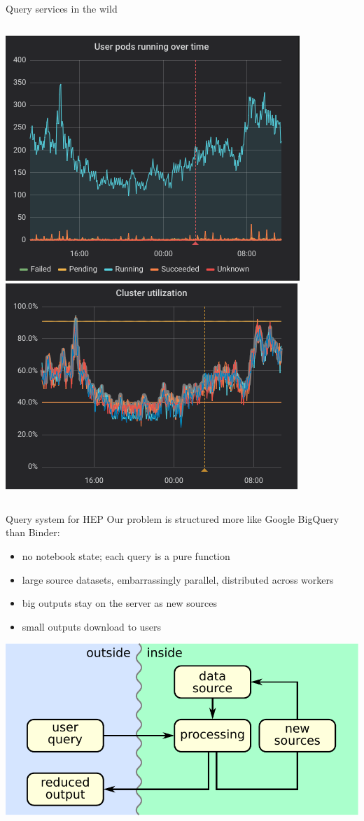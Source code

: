 \documentclass[aspectratio=169]{beamer}
\begin{document}
\begin{frame}{Query services in the wild}
\begin{uncoverenv}
\begin{columns}
\includegraphics[height=3 cm]{binder-notebooks-running.png}\mbox{ }\includegraphics[height=3 cm]{binder-utilization.png}
\end{columns}
\end{uncoverenv}
\end{frame}

\begin{frame}{Query system for HEP}
\vspace{0.35 cm}
Our problem is structured more like Google BigQuery than Binder:

\vspace{0.15 cm}
\begin{itemize}
\item no notebook state; each query is a pure function
\item large source datasets, embarrassingly parallel, distributed across workers
\item big outputs stay on the server as new sources
\item small outputs download to users
\end{itemize}

\vspace{0.15 cm}
\begin{center}
\includegraphics[width=0.6\linewidth]{basic-block-diagram.pdf}
\end{center}
\end{frame}
\end{document}
